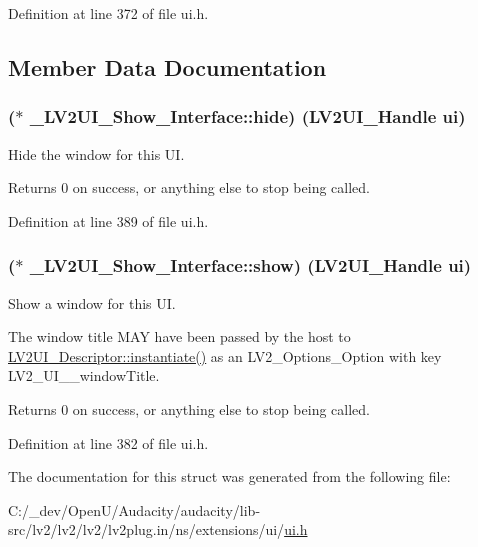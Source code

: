 Definition at line 372 of file ui.\+h.



\subsection{Member Data Documentation}
\subsubsection[{\texorpdfstring{hide}{hide}}]{($\ast$ \+\_\+\+L\+V2\+U\+I\+\_\+\+Show\+\_\+\+Interface\+::hide) ({\bf L\+V2\+U\+I\+\_\+\+Handle} ui)}\hypertarget{struct___l_v2_u_i___show___interface_aa3400c3a2e10bcf7db587f3d3fdf872c}{}\label{struct___l_v2_u_i___show___interface_aa3400c3a2e10bcf7db587f3d3fdf872c}
Hide the window for this UI.

\begin{DoxyReturn}{Returns}
0 on success, or anything else to stop being called. 
\end{DoxyReturn}


Definition at line 389 of file ui.\+h.

\subsubsection[{\texorpdfstring{show}{show}}]{($\ast$ \+\_\+\+L\+V2\+U\+I\+\_\+\+Show\+\_\+\+Interface\+::show) ({\bf L\+V2\+U\+I\+\_\+\+Handle} ui)}\hypertarget{struct___l_v2_u_i___show___interface_ab3e6254c8f5396051a76ee841ead411c}{}\label{struct___l_v2_u_i___show___interface_ab3e6254c8f5396051a76ee841ead411c}
Show a window for this UI.

The window title M\+AY have been passed by the host to \hyperlink{struct___l_v2_u_i___descriptor_a7a3bfa399c6ee276b096b31f837fc0fb}{L\+V2\+U\+I\+\_\+\+Descriptor\+::instantiate()} as an L\+V2\+\_\+\+Options\+\_\+\+Option with key L\+V2\+\_\+\+U\+I\+\_\+\+\_\+window\+Title.

\begin{DoxyReturn}{Returns}
0 on success, or anything else to stop being called. 
\end{DoxyReturn}


Definition at line 382 of file ui.\+h.



The documentation for this struct was generated from the following file\+:\begin{DoxyCompactItemize}
\item 
C\+:/\+\_\+dev/\+Open\+U/\+Audacity/audacity/lib-\/src/lv2/lv2/lv2/lv2plug.\+in/ns/extensions/ui/\hyperlink{ui_8h}{ui.\+h}\end{DoxyCompactItemize}
